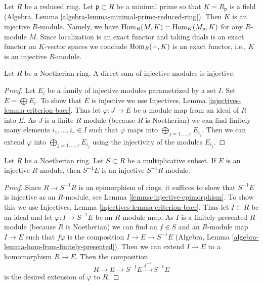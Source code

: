 \begin{example}
\label{example-reduced-ring-injective}
Let $R$ be a reduced ring. Let $\mathfrak p \subset R$ be a minimal prime
so that $K = R_\mathfrak p$ is a field
(Algebra, Lemma \ref{algebra-lemma-minimal-prime-reduced-ring}).
Then $K$ is an injective $R$-module. Namely, we have
$\mathop{\mathrm{Hom}}\nolimits_R(M, K) = \mathop{\mathrm{Hom}}\nolimits_K(M_\mathfrak p, K)$ for any $R$-module
$M$. Since localization is an exact functor and taking duals is
an exact functor on $K$-vector spaces we conclude $\mathop{\mathrm{Hom}}\nolimits_R(-, K)$
is an exact functor, i.e., $K$ is an injective $R$-module.
\end{example}

\begin{lemma}
\label{lemma-sum-injective-modules}
Let $R$ be a Noetherian ring. A direct sum of injective modules
is injective.
\end{lemma}

\begin{proof}
Let $E_i$ be a family of injective modules parametrized by a set $I$.
Set $E = \bigoplus E_i$. To show that $E$ is injective we use
Injectives, Lemma \ref{injectives-lemma-criterion-baer}.
Thus let $\varphi : J \to E$ be a module map from an ideal of $R$
into $E$. As $J$ is a finite $R$-module (because $R$ is Noetherian)
we can find finitely many elements $i_1, \ldots, i_r \in I$
such that $\varphi$ maps into $\bigoplus_{j = 1, \ldots, r} E_{i_j}$.
Then we can extend $\varphi$ into $\bigoplus_{j = 1, \ldots, r} E_{i_j}$
using the injectivity of the modules $E_{i_j}$.
\end{proof}

\begin{lemma}
\label{lemma-localization-injective-modules}
Let $R$ be a Noetherian ring. Let $S \subset R$ be a multiplicative
subset. If $E$ is an injective $R$-module, then $S^{-1}E$ is an
injective $S^{-1}R$-module.
\end{lemma}

\begin{proof}
Since $R \to S^{-1}R$ is an epimorphism of rings, it suffices
to show that $S^{-1}E$ is injective as an $R$-module, see
Lemma \ref{lemma-injective-epimorphism}.
To show this we use Injectives, Lemma \ref{injectives-lemma-criterion-baer}.
Thus let $I \subset R$ be an ideal and let
$\varphi : I \to S^{-1} E$ be an $R$-module map.
As $I$ is a finitely presented $R$-module (because $R$ is Noetherian)
we can find an $f \in S$ and an $R$-module map $I \to E$
such that $f\varphi$ is the composition $I \to E \to S^{-1}E$
(Algebra, Lemma \ref{algebra-lemma-hom-from-finitely-presented}).
Then we can extend $I \to E$ to a homomorphism $R \to E$.
Then the composition
$$
R \to E \to S^{-1}E \xrightarrow{f^{-1}} S^{-1}E
$$
is the desired extension of $\varphi$ to $R$.
\end{proof}


